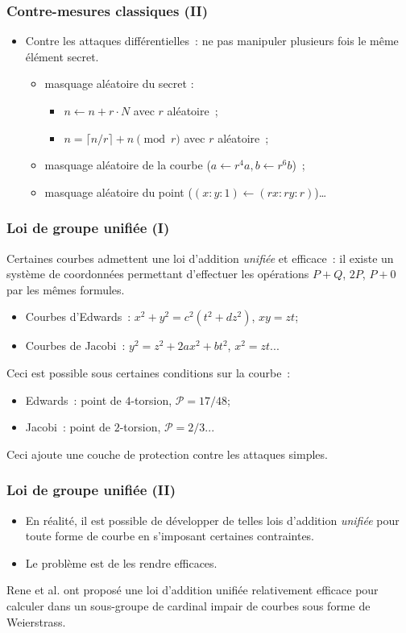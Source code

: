 \documentclass[francais]{beamer}
\newcommand{\prob}{\mathcal{P}}
\begin{document}
\begin{frame}\frametitle{Contre-mesures classiques (II)}
\begin{itemize}
\item Contre les attaques différentielles :
ne pas manipuler plusieurs fois le même élément secret.
\begin{itemize}
\item masquage aléatoire du secret :
\begin{itemize}
\item $n ← n + r · N$ avec $r$ aléatoire ;
\item $n = \lceil n / r \rceil + n \pmod{r}$ avec $r$ aléatoire ;
\end{itemize}
\item masquage aléatoire de la courbe ($a ← r^4 a, b ← r^6 b$) ;
\item masquage aléatoire du point ($(x:y:1) ← (rx:ry:r)$)\ldots
\end{itemize}
\end{itemize}
\end{frame}

\begin{frame}\frametitle{Loi de groupe unifiée (I)}
Certaines courbes admettent une loi d'addition \emph{unifiée} et efficace :
il existe un système de coordonnées permettant d'effectuer
les opérations $P + Q$, $2 P$, $P + 0$ par les mêmes formules.
\begin{itemize}
\item Courbes d'Edwards : $x^2 + y^2 = c^2 (t^2 + d z^2)$, $xy = zt$;
\item Courbes de Jacobi : $y^2 = z^2 + 2 a x^2 + b t^2$, $x^2 = zt$...
\end{itemize}

Ceci est possible sous certaines conditions sur la courbe :
\begin{itemize}
\item Edwards : point de $4$-torsion, $\prob = 17/48$;
\item Jacobi : point de $2$-torsion, $\prob = 2/3$...
\end{itemize}

Ceci ajoute une couche de protection contre les attaques simples.
\end{frame}

\begin{frame}\frametitle{Loi de groupe unifiée (II)}
\begin{itemize}
\item En réalité, il est possible de développer de telles lois d'addition \emph{unifiée} pour toute forme de courbe en s'imposant certaines contraintes.
\item Le problème est de les rendre efficaces.
\end{itemize}
\begin{block}{}
Rene et al. ont proposé une loi d'addition unifiée relativement efficace
pour calculer dans un sous-groupe de cardinal impair
de courbes sous forme de Weierstrass.
\end{block}
\end{frame}
\end{document}
